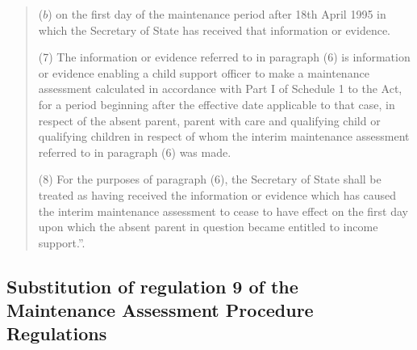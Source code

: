 \documentclass[a4paper]{article}
\begin{document}
\begin{quotation}
\begin{enumerate}
($b$) on the first day of the maintenance period after 18th April 1995 in which the Secretary of State has received that information or evidence.
\end{enumerate}

(7) The information or evidence referred to in paragraph (6) is information or evidence enabling a child support officer to make a maintenance assessment calculated in accordance with Part I of Schedule 1 to the Act, for a period beginning after the effective date applicable to that case, in respect of the absent parent, parent with care and qualifying child or qualifying children in respect of whom the interim maintenance assessment referred to in paragraph (6) was made.

(8) For the purposes of paragraph (6), the Secretary of State shall be treated as having received the information or evidence which has caused the interim maintenance assessment to cease to have effect on the first day upon which the absent parent in question became entitled to income support.”.
\end{quotation}

\subsection[17. Substitution of regulation 9 of the Maintenance Assessment Procedure Regulations]{\sloppy Substitution of regulation 9 of the Maintenance Assessment Procedure Regulations}
\end{document}
